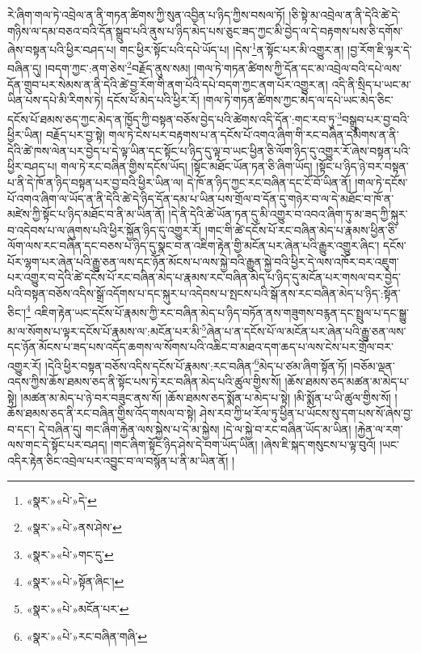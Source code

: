 རེ་ཞིག་གལ་ཏེ་འབྲེལ་ན་ནི་གཏན་ཚིགས་ཀྱི་སུན་འབྱིན་པ་ཉིད་ཀྱིས་བསལ་ཏོ། །ཅི་སྟེ་མ་འབྲེལ་ན་ནི་དེའི་ཚེ་དེ་གཉིས་ལ་དམ་བཅའ་བའི་དོན་སྒྲུབ་པའི་ནུས་པ་ཉིད་མེད་པས་ཅུང་ཟད་ཀྱང་མི་བྱེད་ལ་དེ་བརྟགས་པས་ཅི་དགོས་ཞེས་བསྟན་པའི་ཕྱིར་བཤད་པ། གང་ཕྱིར་སྟོང་པའི་དཔེ་ཡོད་པ། །དེས་\footnote{«སྣར་»«པེ་»དེ་}ན་སྟོང་པར་མི་འགྱུར་ན། །བྱ་རོག་ཇི་ལྟར་དེ་བཞིན་དུ། །བདག་ཀྱང་:ནག་ཅེས་\footnote{«སྣར་»«པེ་»ནས་ཤེས་}བརྗོད་ནུས་སམ། །གལ་ཏེ་གཏན་ཚིགས་ཀྱི་དོན་དང་མ་འབྲེལ་བའི་དཔེ་ལས་དོན་གྲུབ་པར་སེམས་ན་ནི་དེའི་ཚེ་བྱ་རོག་གི་ནག་པོའི་དཔེ་བདག་ཀྱང་ནག་པོར་འགྱུར་ན། འདི་ནི་སྲིད་པ་ཡང་མ་ཡིན་པས་དཔེ་མི་རིགས་ཏེ། དངོས་པོ་མེད་པའི་ཕྱིར་རོ། །གལ་ཏེ་གཏན་ཚིགས་ཀྱང་མེད་ལ་དཔེ་ཡང་མེད་ཅིང་དངོས་པོ་ཐམས་ཅད་ཀྱང་མེད་ན་ཁྱོད་ཀྱི་བསྟན་བཅོས་བྱེད་པའི་ཚེགས་འདི་དོན་:གང་རབ་ཏུ་\footnote{«སྣར་»«པེ་»གང་དུ་}བསྒྲུབ་པར་བྱ་བའི་ཕྱིར་ཡིན། བརྗོད་པར་བྱ་སྟེ། གལ་ཏེ་ངེས་པར་བརྟགས་པ་ན་དངོས་པོ་འགའ་ཞིག་གི་རང་བཞིན་དམིགས་ན་ནི་དེའི་ཚེ་ཁས་ལེན་པར་བྱེད་པ་དེ་ལྟ་ཡིན་དང་སྟོང་པ་ཉིད་དུ་ལྟ་བ་ཡང་ཕྱིན་ཅི་ལོག་ཉིད་དུ་འགྱུར་རོ་ཞེས་བསྟན་པའི་ཕྱིར་བཤད་པ། གལ་ཏེ་རང་བཞིན་གྱིས་དངོས་ཡོད། །སྟོང་མཐོང་ཡོན་ཏན་ཅི་ཞིག་ཡོད། །སྟོང་པ་ཉིད་ཉེ་བར་བསྟན་པ་ནི་དེ་ཁོ་ན་ཉིད་བསྟན་པར་བྱ་བའི་ཕྱིར་ཡིན་ལ། དེ་ཁོ་ན་ཉིད་ཀྱང་རང་བཞིན་དང་ངོ་བོ་ཡིན་ནོ། །གལ་ཏེ་དངོས་པོ་འགའ་ཞིག་ལ་ཡོད་ན་ནི་དེའི་ཚེ་དེ་ཉིད་དོན་དམ་པ་ཡིན་པས་གྲོལ་བ་དོན་དུ་གཉེར་བ་ལ་དེ་མཐོང་བ་ཁོ་ན་མཛེས་ཀྱི་སྟོང་པ་ཉིད་མཐོང་བ་ནི་མ་ཡིན་ནོ། །དེ་ནི་དེའི་ཚེ་ཡོན་ཏན་དུ་མི་འགྱུར་བ་འབའ་ཞིག་ཏུ་མ་ཟད་ཀྱི་སྐུར་བ་འདེབས་པ་ལ་ཞུགས་པའི་ཕྱིར་སྐྱོན་ཉིད་དུ་འགྱུར་རོ། །གང་གི་ཚེ་དངོས་པོ་རང་བཞིན་མེད་པ་རྣམས་ཕྱིན་ཅི་ལོག་ལས་རང་བཞིན་དང་བཅས་པ་ཉིད་དུ་སྣང་བ་ན་འཇིག་རྟེན་གྱི་མངོན་པར་ཞེན་པའི་རྒྱུར་འགྱུར་ཞིང་། དངོས་པོར་ལྷག་པར་ཞེན་པའི་རྒྱུ་ཅན་ལས་དང་ཉོན་མོངས་པ་ལས་སྐྱེ་བའི་རྒྱུན་སྐྱེ་བའི་ཕྱིར་དེ་ལས་འཁོར་བར་འཇུག་པར་འགྱུར་བ་དེའི་ཚེ་དངོས་པོ་རང་བཞིན་མེད་པ་རྣམས་རང་བཞིན་མེད་པ་ཉིད་དུ་མངོན་པར་གསལ་བར་བྱེད་པའི་བསྟན་བཅོས་འདིས་སྒྲོ་འདོགས་པ་དང་སྐུར་པ་འདེབས་པ་སྤངས་པའི་སྒོ་ནས་རང་བཞིན་མེད་པ་ཉིད་:སྟོན་ཅིང་།\footnote{«སྣར་»«པེ་»སྟོན་ཞིང་།} འཇིག་རྟེན་ཡང་དངོས་པོ་རྣམས་ཀྱི་རང་བཞིན་མེད་པ་ཉིད་བཏོན་ནས་གཟུགས་བརྙན་དང་སྤྲུལ་པ་དང་སྒྱུ་མ་ལ་སོགས་པ་ལྟར་དངོས་པོ་རྣམས་ལ་:མངོན་པར་མི་\footnote{«སྣར་»«པེ་»མངོན་པར་}ཞེན་པ་ན་དངོས་པོ་ལ་མངོན་པར་ཞེན་པའི་རྒྱུ་ཅན་ལས་དང་ཉོན་མོངས་པ་ཟད་པས་འདོད་ཆགས་ལ་སོགས་པའི་འཆིང་བ་མཐའ་དག་ཆད་པ་ལས་ངེས་པར་གྲོལ་བར་འགྱུར་རོ། །དེའི་ཕྱིར་བསྟན་བཅོས་འདིས་དངོས་པོ་རྣམས་:རང་བཞིན་\footnote{«སྣར་»«པེ་»རང་བཞིན་གཞི་}མེད་པ་ཙམ་ཞིག་སྟོན་ཏོ། །བཅོམ་ལྡན་འདས་ཀྱིས་ཆོས་ཐམས་ཅད་ནི་སྟོང་པས་ཏེ་རང་བཞིན་མེད་པའི་ཚུལ་གྱིས་སོ། །ཆོས་ཐམས་ཅད་མཚན་མ་མེད་པ་སྟེ། །མཚན་མ་མེད་པ་ཉེ་བར་བཟུང་ནས་སོ། །ཆོས་ཐམས་ཅད་སྨོན་པ་མེད་པ་སྟེ། །མི་སྨོན་པ་ཡི་ཚུལ་གྱིས་སོ། །ཆོས་ཐམས་ཅད་ནི་རང་བཞིན་གྱིས་འོད་གསལ་བ་སྟེ། ཤེས་རབ་ཀྱི་ཕ་རོལ་ཏུ་ཕྱིན་པ་ཡོངས་སུ་དག་པས་སོ་ཞེས་བྱ་བ་དང་། དེ་བཞིན་དུ། གང་ཞིག་རྐྱེན་ལས་སྐྱེས་པ་དེ་མ་སྐྱེས། །དེ་ལ་སྐྱེ་བ་རང་བཞིན་ཡོད་མ་ཡིན། །རྐྱེན་ལ་རག་ལས་གང་དེ་སྟོང་པར་བཤད། །གང་ཞིག་སྟོང་ཉིད་ཤེས་དེ་བག་ཡོད་ཡིན། །ཞེས་ཇི་སྐད་གསུངས་པ་ལྟ་བུའོ། །ཡང་འདིར་རྟེན་ཅིང་འབྲེལ་པར་འབྱུང་བ་ལ་བསྙོན་པ་ནི་མ་ཡིན་ནོ། །
